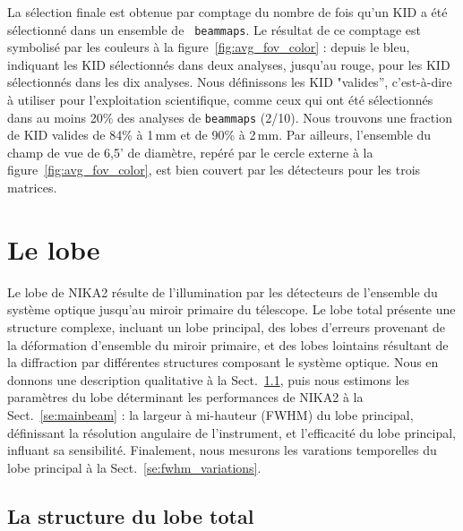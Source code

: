La sélection finale est obtenue par comptage du nombre
de fois qu'un KID a été sélectionné dans un ensemble de {\tt
  beammaps}. Le résultat de ce comptage est symbolisé par les couleurs
à la figure~\ref{fig:avg_fov_color} : depuis le bleu, indiquant les KID
sélectionnés dans deux analyses, jusqu'au rouge, pour les KID
sélectionnés dans les dix analyses. Nous définissons les KID
"valides'', c'est-à-dire à utiliser pour l'exploitation scientifique,
comme ceux qui ont été sélectionnés dans au moins 20\% des analyses de
{\tt beammaps} (2/10). Nous trouvons une fraction de KID valides de
84\% à 1\,mm et de 90\% à 2\,mm. Par ailleurs, l'ensemble du champ de
vue de 6,5' de diamètre, repéré par le cercle externe à la
figure~\ref{fig:avg_fov_color}, est bien couvert par les détecteurs
pour les trois matrices. 




%
%
\section{Le lobe}
\label{se:beam}

Le lobe de NIKA2 résulte de l'illumination par les détecteurs de l'ensemble
du système optique jusqu'au miroir primaire du télescope. Le lobe
total présente une structure complexe, incluant un lobe principal, des
lobes d'erreurs provenant de la déformation d'ensemble du miroir
primaire, et des lobes lointains résultant de la diffraction par
différentes structures composant le système optique. Nous en donnons
une description qualitative à la Sect.~\ref{se:fullbeam}, puis nous
estimons les paramètres du lobe déterminant les performances de NIKA2
à la Sect.~\ref{se:mainbeam} : la largeur à mi-hauteur (FWHM) du lobe
principal, définissant la résolution angulaire de l'instrument, et
l'efficacité du lobe principal, influant sa sensibilité. Finalement,
nous mesurons les varations temporelles du lobe principal à la
Sect.~\ref{se:fwhm_variations}.


\subsection{La structure du lobe total}
\label{se:fullbeam}

